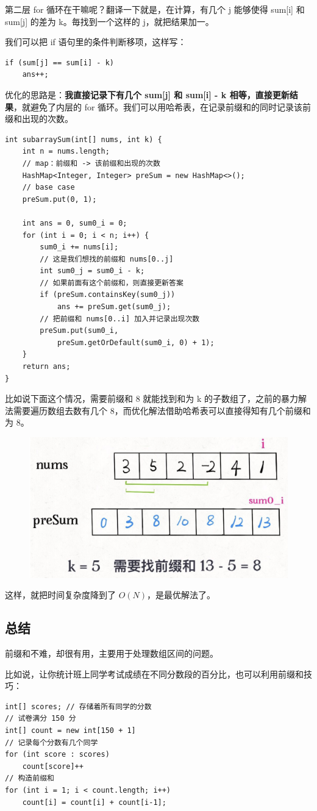 \documentclass[12pt]{article}
\begin{document}
第二层 for 循环在干嘛呢？翻译一下就是，在计算，有几个 j 能够使得 sum[i] 和 sum[j] 的差为 k。毎找到一个这样的 j，就把结果加一。

我们可以把 if 语句里的条件判断移项，这样写：
\begin{lstlisting}
if (sum[j] == sum[i] - k)
    ans++;
\end{lstlisting}

优化的思路是：\textbf{我直接记录下有几个 sum[j] 和 sum[i] - k 相等，直接更新结果}，就避免了内层的 for 循环。我们可以用哈希表，在记录前缀和的同时记录该前缀和出现的次数。
\begin{lstlisting}
int subarraySum(int[] nums, int k) {
    int n = nums.length;
    // map：前缀和 -> 该前缀和出现的次数
    HashMap<Integer, Integer> preSum = new HashMap<>();
    // base case
    preSum.put(0, 1);

    int ans = 0, sum0_i = 0;
    for (int i = 0; i < n; i++) {
        sum0_i += nums[i];
        // 这是我们想找的前缀和 nums[0..j]
        int sum0_j = sum0_i - k;
        // 如果前面有这个前缀和，则直接更新答案
        if (preSum.containsKey(sum0_j))
            ans += preSum.get(sum0_j);
        // 把前缀和 nums[0..i] 加入并记录出现次数
        preSum.put(sum0_i, 
            preSum.getOrDefault(sum0_i, 0) + 1);
    }
    return ans;
}
\end{lstlisting}

比如说下面这个情况，需要前缀和 8 就能找到和为 k 的子数组了，之前的暴力解法需要遍历数组去数有几个 8，而优化解法借助哈希表可以直接得知有几个前缀和为 8。
\begin{figure}[H]
    \centering
    \includegraphics[width=.4\textwidth]{fig/Prefix_Tricks_3.png}
\end{figure}

这样，就把时间复杂度降到了 $O(N)$，是最优解法了。

\subsection{总结}
前缀和不难，却很有用，主要用于处理数组区间的问题。

比如说，让你统计班上同学考试成绩在不同分数段的百分比，也可以利用前缀和技巧：
\begin{lstlisting}
int[] scores; // 存储着所有同学的分数
// 试卷满分 150 分
int[] count = new int[150 + 1]
// 记录每个分数有几个同学
for (int score : scores)
    count[score]++
// 构造前缀和
for (int i = 1; i < count.length; i++)
    count[i] = count[i] + count[i-1];
\end{lstlisting}
\end{document}
